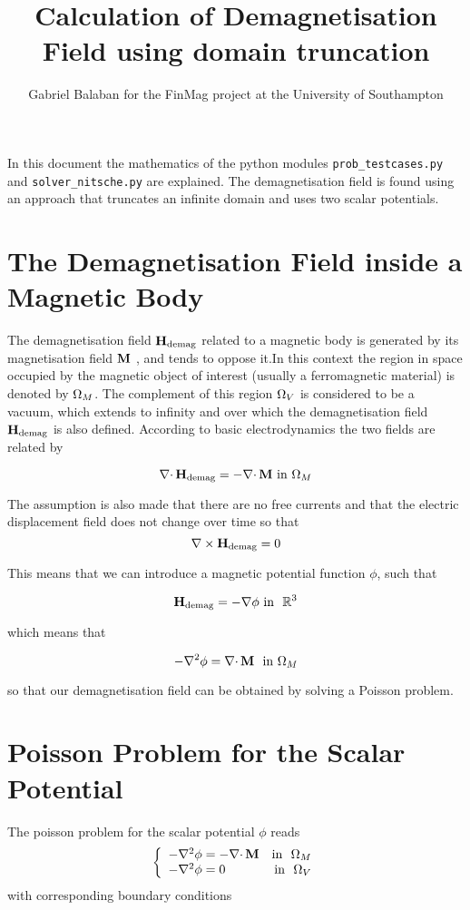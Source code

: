 \documentclass[12pt,a4paper,notitlepage]{article}
\title{Calculation of Demagnetisation Field using domain truncation}
\author{Gabriel Balaban for the FinMag project at the University of Southampton}
\begin{document}
\maketitle
\abstract{}
In this document the mathematics of the python modules \texttt{prob\_testcases.py} and \texttt{solver\_nitsche.py} are explained.
The demagnetisation field is found using an approach that truncates an infinite domain and uses two scalar potentials.

\newpage
\section{The Demagnetisation Field inside a Magnetic Body} 
The demagnetisation field $\mathbf{H}_\mathrm{demag}$ related to a magnetic body is generated by its magnetisation field $\mathbf{M}$ ,
 and tends to oppose it.In this context the region in space occupied by the magnetic object of interest 
(usually a ferromagnetic material) is denoted by  $\Omega_M$.
The complement of this region $\Omega_V$ is considered to be a vacuum, which extends to infinity and over which
the demagnetisation field
$\mathbf{H}_\mathrm{demag} $ is also defined.
According to basic electrodynamics the two fields are related by

\begin{equation}\label{dmagdef} \nabla \cdotp \mathbf{H}_\mathrm{demag} = - \nabla \cdotp \mathbf{M} \  \mbox{in} \ \Omega_M \end{equation}

\noindent The assumption is also made that there are no free currents and that the electric displacement field does not change over time so that
\begin{equation}\label{nocurl}  \nabla \times \mathbf{H}_\mathrm{demag} = 0\end{equation}

\noindent This means that we can introduce a magnetic potential function $\phi$, such that

\[ \dmag = - \nabla \phi \  \mbox{in} \ \ \mathbb{R}^3 \]

\noindent which means that 

\[ - \nabla^2 \phi = \nabla \cdotp \magn \ \ \mbox{in} \ \omM \]

\noindent so that our demagnetisation field can be obtained by solving a Poisson problem.

\section{Poisson Problem for the Scalar Potential}
The poisson problem for the scalar potential $\phi$ reads
\begin{equation}\label{phidef} 
\left\{
\begin{array}{lr}
- \nabla^2 \phi = - \nabla \cdotp \mathbf{M}  & \mbox{in } \ \Omega_M \\
- \nabla^2 \phi = 0 & \mbox{in } \ \Omega_V 
\end{array}
\right.
\end{equation}
\noindent with corresponding boundary conditions
\end{document}
